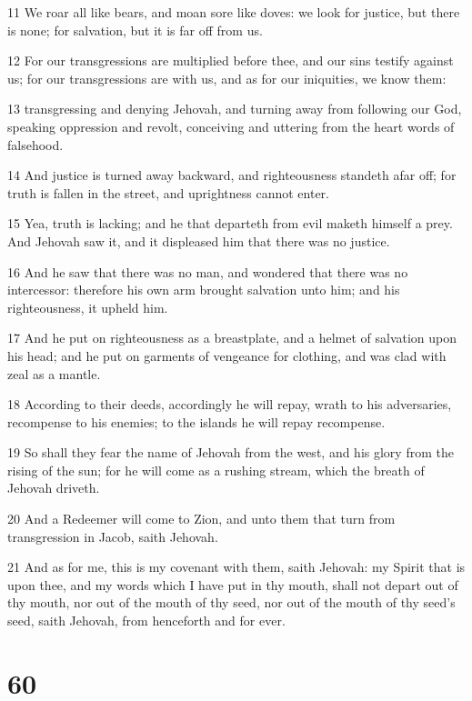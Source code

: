 \par 11 We roar all like bears, and moan sore like doves: we look for justice, but there is none; for salvation, but it is far off from us.
\par 12 For our transgressions are multiplied before thee, and our sins testify against us; for our transgressions are with us, and as for our iniquities, we know them:
\par 13 transgressing and denying Jehovah, and turning away from following our God, speaking oppression and revolt, conceiving and uttering from the heart words of falsehood.
\par 14 And justice is turned away backward, and righteousness standeth afar off; for truth is fallen in the street, and uprightness cannot enter.
\par 15 Yea, truth is lacking; and he that departeth from evil maketh himself a prey. And Jehovah saw it, and it displeased him that there was no justice.
\par 16 And he saw that there was no man, and wondered that there was no intercessor: therefore his own arm brought salvation unto him; and his righteousness, it upheld him.
\par 17 And he put on righteousness as a breastplate, and a helmet of salvation upon his head; and he put on garments of vengeance for clothing, and was clad with zeal as a mantle.
\par 18 According to their deeds, accordingly he will repay, wrath to his adversaries, recompense to his enemies; to the islands he will repay recompense.
\par 19 So shall they fear the name of Jehovah from the west, and his glory from the rising of the sun; for he will come as a rushing stream, which the breath of Jehovah driveth.
\par 20 And a Redeemer will come to Zion, and unto them that turn from transgression in Jacob, saith Jehovah.
\par 21 And as for me, this is my covenant with them, saith Jehovah: my Spirit that is upon thee, and my words which I have put in thy mouth, shall not depart out of thy mouth, nor out of the mouth of thy seed, nor out of the mouth of thy seed's seed, saith Jehovah, from henceforth and for ever.

\chapter{60}

